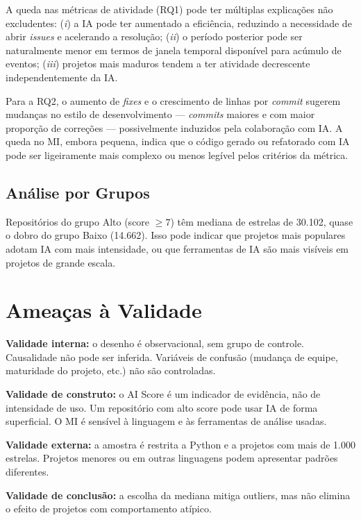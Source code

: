 \documentclass[12pt,a4paper,twocolumn]{article}
\begin{document}
A queda nas métricas de atividade (RQ1) pode ter múltiplas explicações não excludentes:
(\textit{i}) a IA pode ter aumentado a eficiência, reduzindo a necessidade de abrir
\textit{issues} e acelerando a resolução; (\textit{ii}) o período posterior pode ser
naturalmente menor em termos de janela temporal disponível para acúmulo de eventos;
(\textit{iii}) projetos mais maduros tendem a ter atividade decrescente independentemente
da IA.

Para a RQ2, o aumento de \textit{fixes} e o crescimento de linhas por \textit{commit}
sugerem mudanças no estilo de desenvolvimento --- \textit{commits} maiores e com maior
proporção de correções --- possivelmente induzidos pela colaboração com IA. A queda no
MI, embora pequena, indica que o código gerado ou refatorado com IA pode ser
ligeiramente mais complexo ou menos legível pelos critérios da métrica.

\subsection{Análise por Grupos}

Repositórios do grupo Alto (score $\geq 7$) têm mediana de estrelas de 30.102, quase
o dobro do grupo Baixo (14.662). Isso pode indicar que projetos mais populares adotam
IA com mais intensidade, ou que ferramentas de IA são mais visíveis em projetos de
grande escala.

\section{Ameaças à Validade}

\textbf{Validade interna:} o desenho é observacional, sem grupo de controle.
Causalidade não pode ser inferida. Variáveis de confusão (mudança de equipe,
maturidade do projeto, etc.) não são controladas.

\textbf{Validade de construto:} o AI Score é um indicador de evidência, não de
intensidade de uso. Um repositório com alto score pode usar IA de forma superficial.
O MI é sensível à linguagem e às ferramentas de análise usadas.

\textbf{Validade externa:} a amostra é restrita a Python e a projetos com mais de
1.000 estrelas. Projetos menores ou em outras linguagens podem apresentar padrões
diferentes.

\textbf{Validade de conclusão:} a escolha da mediana mitiga outliers, mas não elimina
o efeito de projetos com comportamento atípico.
\end{document}
